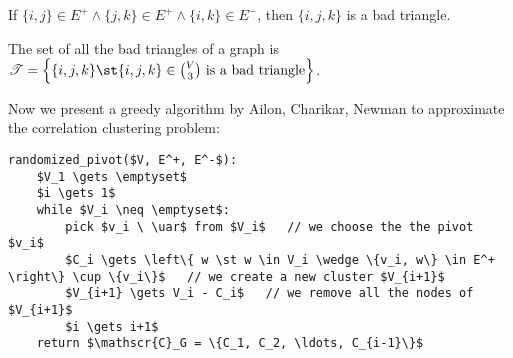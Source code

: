 \begin{defn}
    If $\{i,j\} \in E^+ \wedge \{j,k\} \in E^+ \wedge \{i,k\} \in E^-$, then $\{i,j,k\}$ is a bad triangle.
    
    The set of all the bad triangles of a graph is $\mathscr{T} = \left\{ \{i,j,k\} \st \{i,j,k\} \in \binom{V}{3} \text{ is a bad triangle} \right\}$.
\end{defn}

Now we present a greedy algorithm by Ailon, Charikar, Newman to approximate the correlation clustering problem:
\begin{lstlisting}[caption={Randomized Pivot}, label={lst:clust-random-pivot}]
randomized_pivot($V, E^+, E^-$):
    $V_1 \gets \emptyset$
    $i \gets 1$
    while $V_i \neq \emptyset$:
        pick $v_i \ \uar$ from $V_i$   // we choose the the pivot $v_i$
        $C_i \gets \left\{ w \st w \in V_i \wedge \{v_i, w\} \in E^+ \right\} \cup \{v_i\}$   // we create a new cluster $V_{i+1}$
        $V_{i+1} \gets V_i - C_i$   // we remove all the nodes of $V_{i+1}$
        $i \gets i+1$
    return $\mathscr{C}_G = \{C_1, C_2, \ldots, C_{i-1}\}$
\end{lstlisting}

